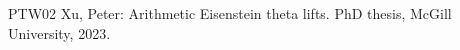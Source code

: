 \documentclass[12pt,amstex,amssymb]{article}
\theoremstyle{plain}
\theoremstyle{definition}
\begin{document}
{\begin{thebibliography}{PTW02}
 Xu, Peter: Arithmetic Eisenstein theta lifts. PhD thesis, McGill University, 2023.

%
%  
%
%
%
%
%
%
%
%
%
%
%
%
%

\end{thebibliography}}
\end{document}
